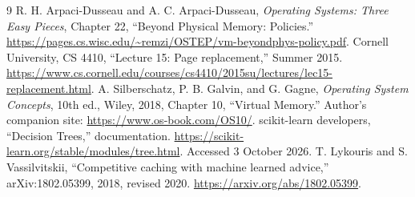 \documentclass[11pt,a4paper]{article}
\begin{document}
\begin{thebibliography}{9}\small
{} R. H. Arpaci-Dusseau and A. C. Arpaci-Dusseau,
\emph{Operating Systems: Three Easy Pieces}, Chapter 22, ``Beyond Physical Memory:
Policies.'' \url{https://pages.cs.wisc.edu/~remzi/OSTEP/vm-beyondphys-policy.pdf}.
 Cornell University, CS 4410, ``Lecture 15: Page replacement,''
Summer 2015. \url{https://www.cs.cornell.edu/courses/cs4410/2015su/lectures/lec15-replacement.html}.
 A. Silberschatz, P. B. Galvin, and G. Gagne,
\emph{Operating System Concepts}, 10th ed., Wiley, 2018, Chapter 10, ``Virtual
Memory.'' Author's companion site: \url{https://www.os-book.com/OS10/}.
 scikit-learn developers, ``Decision Trees,'' documentation.
\url{https://scikit-learn.org/stable/modules/tree.html}. Accessed 3 October 2026.
 T. Lykouris and S. Vassilvitskii, ``Competitive caching with
machine learned advice,'' arXiv:1802.05399, 2018, revised 2020.
\url{https://arxiv.org/abs/1802.05399}.
\end{thebibliography}
\end{document}
